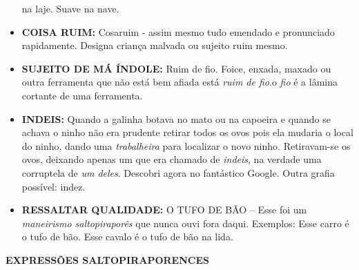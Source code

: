 \documentclass[12pt,brazil,]{book}
\begin{document}
\begin{itemize}
  na laje. Suave na nave.\\
\item
  \textbf{COISA RUIM:} Cosaruim - assim mesmo tudo emendado e
  pronunciado rapidamente. Designa criança malvada ou sujeito ruim
  mesmo.\\
\item
  \textbf{SUJEITO DE MÁ ÍNDOLE:} Ruim de fio. Foice, enxada, maxado ou
  outra ferramenta que não está bem afiada está \emph{ruim de fio}.o
  \emph{fio} é a lâmina cortante de uma ferramenta.\\
\item
  \textbf{INDEIS:} Quando a galinha botava no mato ou na capoeira e
  quando se achava o ninho não era prudente retirar todos os ovos pois
  ela mudaria o local do ninho, dando uma \emph{trabalheira} para
  localizar o novo ninho. Retiravam-se os ovos, deixando apenas um que
  era chamado de \emph{indeis}, na verdade uma corruptela de \emph{um
  deles}. Descobri agora no fantástico Google. Outra grafia possível:
  indez.\\
\item
  \textbf{RESSALTAR QUALIDADE:} O TUFO DE BÃO -- Esse foi um
  \emph{maneirismo saltopiraporês} que nunca ouvi fora daqui. Exemplos:
  Esse carro é o tufo de bão. Esse cavalo é o tufo de bão na lida.
\end{itemize}

\textbf{EXPRESSÕES SALTOPIRAPORENCES}
\end{document}
